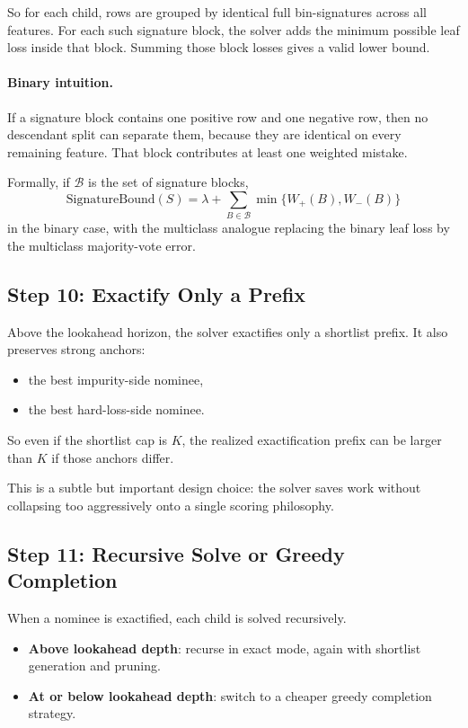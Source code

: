 \documentclass[11pt]{article}
\begin{document}
So for each child, rows are grouped by identical full bin-signatures across all features. For each such signature block, the solver adds the minimum possible leaf loss inside that block. Summing those block losses gives a valid lower bound.

\paragraph{Binary intuition.}
If a signature block contains one positive row and one negative row, then no descendant split can separate them, because they are identical on every remaining feature. That block contributes at least one weighted mistake.

Formally, if \(\mathcal{B}\) is the set of signature blocks,
\[
\mathrm{SignatureBound}(S)
=
\lambda + \sum_{B \in \mathcal{B}} \min\{W_+(B), W_-(B)\}
\]
in the binary case, with the multiclass analogue replacing the binary leaf loss by the multiclass majority-vote error.

\subsection{Step 10: Exactify Only a Prefix}

Above the lookahead horizon, the solver exactifies only a shortlist prefix. It also preserves strong anchors:

\begin{itemize}
\item the best impurity-side nominee,
\item the best hard-loss-side nominee.
\end{itemize}

So even if the shortlist cap is \(K\), the realized exactification prefix can be larger than \(K\) if those anchors differ.

This is a subtle but important design choice: the solver saves work without collapsing too aggressively onto a single scoring philosophy.

\subsection{Step 11: Recursive Solve or Greedy Completion}

When a nominee is exactified, each child is solved recursively.

\begin{itemize}
\item \textbf{Above lookahead depth}: recurse in exact mode, again with shortlist generation and pruning.
\item \textbf{At or below lookahead depth}: switch to a cheaper greedy completion strategy.
\end{itemize}
\end{document}
